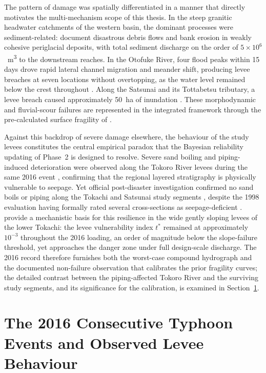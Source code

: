 The pattern of damage was spatially differentiated in a manner that directly motivates the multi-mechanism scope of this thesis. In the steep granitic headwater catchments of the western basin, the dominant processes were sediment-related: \textcite{furuichi_2018} document disastrous debris flows and bank erosion in weakly cohesive periglacial deposits, with total sediment discharge on the order of $5\times10^{6}$~m\textsuperscript{3} to the downstream reaches. In the Otofuke River, four flood peaks within 15 days drove rapid lateral channel migration and meander shift, producing levee breaches at seven locations without overtopping, as the water level remained below the crest throughout \parencite{kyuka_2020}. Along the Satsunai and its Tottabetsu tributary, a levee breach caused approximately 50~ha of inundation \parencite{fukuoka_2019}. These morphodynamic and fluvial-scour failures are represented in the integrated framework through the pre-calculated surface fragility of \textcite{uemura_phd_2025}.

Against this backdrop of severe damage elsewhere, the behaviour of the study levees constitutes the central empirical paradox that the Bayesian reliability updating of Phase~2 is designed to resolve. Severe sand boiling and piping-induced deterioration were observed along the Tokoro River levees during the same 2016 event \parencite{kawajiri_2025, tokorogawa_2017}, confirming that the regional layered stratigraphy is physically vulnerable to seepage. Yet official post-disaster investigation confirmed no sand boils or piping along the Tokachi and Satsunai study segments \parencite{tokachi_levee_committee_2017}, despite the 1998 evaluation having formally rated several cross-sections as seepage-deficient \parencite{oyo_1999}. \textcite{fukuoka_2019} provide a mechanistic basis for this resilience in the wide gently sloping levees of the lower Tokachi: the levee vulnerability index $t^{*}$ remained at approximately $10^{-3}$ throughout the 2016 loading, an order of magnitude below the slope-failure threshold, yet approaches the danger zone under full design-scale discharge. The 2016 record therefore furnishes both the worst-case compound hydrograph and the documented non-failure observation that calibrates the prior fragility curves; the detailed contrast between the piping-affected Tokoro River and the surviving study segments, and its significance for the calibration, is examined in Section~\ref{sec: The 2016 Consecutive Typhoon Events and Observed Levee Behaviour}.

\section{The 2016 Consecutive Typhoon Events and Observed Levee Behaviour}
\label{sec: The 2016 Consecutive Typhoon Events and Observed Levee Behaviour}

